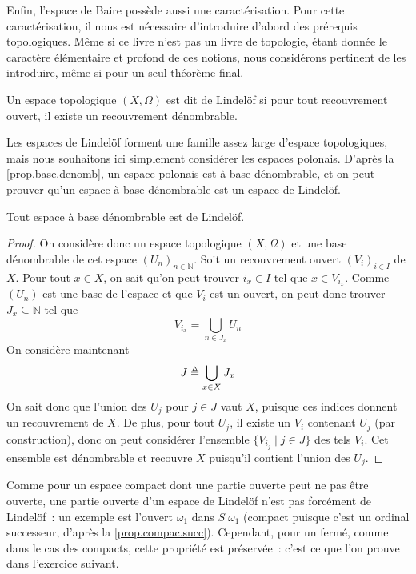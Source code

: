 Enfin, l'espace de Baire possède aussi une caractérisation. Pour cette
caractérisation, il nous est nécessaire d'introduire d'abord des prérequis
topologiques. Même si ce livre n'est pas un livre de topologie, étant donnée le
caractère élémentaire et profond de ces notions, nous considérons pertinent de
les introduire, même si pour un seul théorème final.

\begin{definition}
  Un espace topologique $(X,\Omega)$ est dit de Lindelöf si pour tout
  recouvrement ouvert, il existe un recouvrement dénombrable.
\end{definition}

Les espaces de Lindelöf forment une famille assez large d'espace topologiques,
mais nous souhaitons ici simplement considérer les espaces polonais. D'après
la \cref{prop.base.denomb}, un espace polonais est à base dénombrable, et on
peut prouver qu'un espace à base dénombrable est un espace de Lindelöf.

\begin{lemma}[Lindelöf]\label{lem.lindelof}
  Tout espace à base dénombrable est de Lindelöf.
\end{lemma}

\begin{proof}
  On considère donc un espace topologique $(X,\Omega)$ et une base dénombrable
  de cet espace $(U_n)_{n \in \mathbb N}$. Soit un recouvrement ouvert
  $(V_i)_{i \in I}$ de $X$. Pour tout $x \in X$, on sait qu'on peut trouver
  $i_x \in I$ tel que $x \in V_{i_x}$. Comme $(U_n)$ est une base de l'espace et
  que $V_i$ est un ouvert, on peut donc trouver $J_x \subseteq \mathbb N$ tel
  que
  \[V_{i_x} = \bigcup_{n \in J_x} U_n\]
  On considère maintenant
  \[J \triangleq \bigcup_{x \in X} J_x\]
  On sait donc que l'union des $U_j$ pour $j \in J$ vaut $X$, puisque ces
  indices donnent un recouvrement de $X$. De plus, pour tout $U_j$, il existe
  un $V_i$ contenant $U_j$ (par construction), donc on peut considérer
  l'ensemble $\{V_{i_j}\mid j \in J\}$ des tels $V_i$. Cet ensemble est
  dénombrable et recouvre $X$ puisqu'il contient l'union des $U_j$.
\end{proof}

Comme pour un espace compact dont une partie ouverte peut ne pas être ouverte,
une partie ouverte d'un espace de Lindelöf n'est pas forcément de Lindelöf~:
un exemple est l'ouvert $\omega_1$ dans $S\;\omega_1$ (compact puisque c'est un
ordinal successeur, d'après la \cref{prop.compac.succ}). Cependant, pour un
fermé, comme dans le cas des compacts, cette propriété est préservée~: c'est ce
que l'on prouve dans l'exercice suivant.

